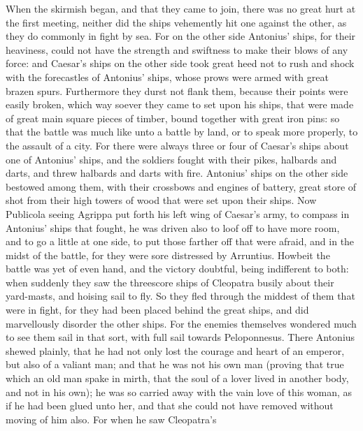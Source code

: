 \documentclass{book}
\begin{document}
\prosa 

\noindent When the skirmish began, and that they came to join, there was no
great hurt at the first meeting, neither did the ships vehemently hit
one against the other, as they do commonly in fight by sea. For on the
other side Antonius' ships, for their heaviness, could not have the
strength and swiftness to make their blows of any force: and Caesar's
ships on the other side took great heed not to rush and shock with
the forecastles of Antonius' ships, whose prows were armed with great
brazen spurs. Furthermore they durst not flank them, because their
points were easily broken, which way soever they came to set upon his
ships, that were made of great main square pieces of timber, bound
together with great iron pins: so that the battle was much like unto a
battle by land, or to speak more properly, to the assault of a city.
For there were always three or four of Caesar's ships about one of
Antonius' ships, and the soldiers fought with their pikes, halbards
and darts, and threw halbards and darts with fire. Antonius' ships on
the other side bestowed among them, with their crossbows and engines
of battery, great store of shot from their high towers of wood that
were set upon their ships. Now Publicola seeing Agrippa put forth his
left wing of Caesar's army, to compass in Antonius' ships that fought,
he was driven also to loof off to have more room, and to go a little
at one side, to put those farther off that were afraid, and in the
midst of the battle, for they were sore distressed by Arruntius.
Howbeit the battle was yet of even hand, and
the victory doubtful, being indifferent to both: when suddenly they
saw the threescore ships of 
Cleopatra busily about their yard-masts,
and hoising sail to fly. So they fled through the middest of them that
were in fight, for they had been placed behind the great ships, and
did marvellously disorder the other ships. For the enemies themselves
wondered much to see them sail in that sort, with full sail towards
Peloponnesus.
There  Antonius
shewed plainly, that he had not only lost the courage and heart of an
emperor, but also of a valiant man; and that he was not his own man
(proving that true which an old man spake in mirth, that the soul of
a lover lived in another body, and not in his own); he was so carried
away with the vain love of this woman, as if he had been glued unto
her, and that she could not have removed without moving of him also.
For  when he saw Cleopatra's
\end{document}
